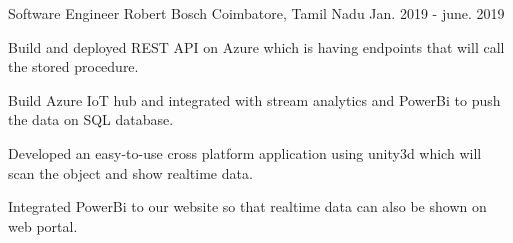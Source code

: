 

\begin{cventries}

  \cventry
    {Software Engineer} %
    {Robert Bosch} %
    {Coimbatore, Tamil Nadu} %
    {Jan. 2019 - june. 2019} %
    {
      \begin{cvitems} %
        \item {Build and deployed REST API on Azure which is having endpoints that will call the stored procedure.}
         \item {Build Azure IoT hub and integrated with stream analytics and PowerBi to push the data on SQL database.}
         \item {Developed an easy-to-use cross platform application using unity3d which will scan the object and show realtime data.}
        \item {Integrated PowerBi to our website so that realtime data can also be shown on web portal.}
      \end{cvitems}
    }




\end{cventries}
